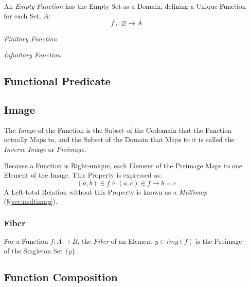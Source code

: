 An \emph{Empty Function} has the Empty Set as a Domain, defining a
Unique Function for each Set, $A$:
\[
  f_A : \varnothing \rightarrow A
\]

\emph{Finitary Function}

\emph{Infinitary Function}



\subsection{Functional Predicate}\label{sec:functional_predicate}

\subsection{Image}\label{sec:image}

The \emph{Image} of the Function is the Subset of the Codomain that
the Function actually Maps to, and the Subset of the Domain that Maps
to it is called the \emph{Inverse Image} or \emph{Preimage}.

Because a Function is Right-unique, each Element of the Preimage Maps
to one Element of the Image. This Property is expressed as:
\[
  (a,b) \in f \wedge (a,c) \in f \rightarrow b = c
\]
A Left-total Relation without this Property is known as a
\emph{Multimap} (\S\ref{sec:multimap}).



\subsubsection{Fiber}\label{sec:fiber}

For a Function $f : A \rightarrow B$, the \emph{Fiber} of an Element
$y \in img(f)$ is the Preimage of the Singleton Set $\{y\}$.



\subsection{Function Composition}\label{sec:function_composition}

